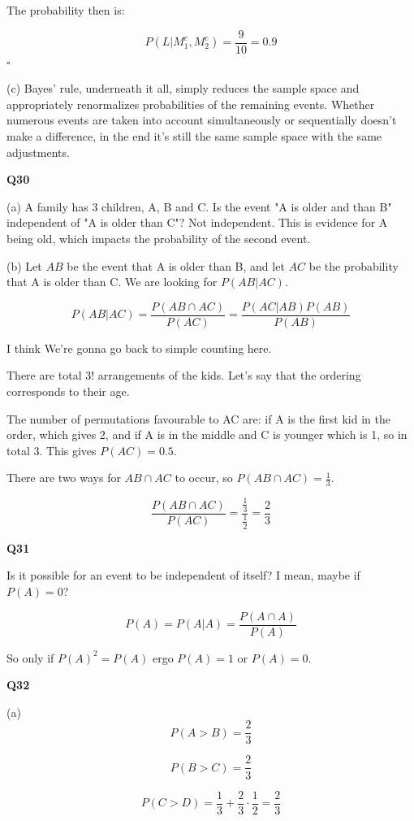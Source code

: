 \documentclass{article}
\newcommand{\qed}{\hfill$\square$}
\begin{document}
				The probability then is:
				
				$$P(L\vert M_1^c, M_2^c) = \frac{9}{10} = 0.9$$\qed
				
			(c) Bayes' rule, underneath it all, simply reduces the sample space and appropriately renormalizes probabilities of the remaining events. Whether numerous events are taken into account simultaneously or sequentially doesn't make a difference, in the end it's still the same sample space with the same adjustments.
			
		\hfill
			
		\textbf{Q30}
		
			(a) A family has 3 children, A, B and C. Is the event "A is older and than B" independent of "A is older than C"?
			Not independent. This is evidence for A being old, which impacts the probability of the second event.
			
			(b) Let $AB$ be the event that A is older than B, and let $AC$ be the probability that A is older than C. We are looking for $P(AB\vert AC)$.
			
			$$P(AB\vert AC) = \frac{P(AB\cap AC)}{P(AC)} = \frac{P(AC\vert AB)P(AB)}{P(AB)} $$
			
			I think We're gonna go back to simple counting here.
			
			There are total 3! arrangements of the kids. Let's say that the ordering corresponds to their age. 
			
			The number of permutations favourable to AC are: if A is the first kid in the order, which gives 2, and if A is in the middle and C is younger which is 1, so in total 3. This gives $P(AC) = 0.5$.
			
			There are two ways for $AB\cap AC$ to occur, so $P(AB\cap AC) = \frac{1}{3}$.
			
			$$\frac{P(AB\cap AC)}{P(AC)} = \frac{\frac{1}{3}}{\frac{1}{2}} = \frac{2}{3}$$
			
		\textbf{Q31}
		
			Is it possible for an event to be independent of itself? I mean, maybe if $P(A) = 0$?
			
			$$P(A) = P(A\vert A) = \frac{P(A\cap A)}{P(A)} $$
			
			So only if $P(A)^2 = P(A)$ ergo $P(A) = 1$ or $P(A) = 0$.
			
		\textbf{Q32}
		
			(a) $$P(A > B) = \frac{2}{3}$$
			
			$$P(B > C) = \frac{2}{3}$$
			
			$$P(C > D) = \frac{1}{3} + \frac{2}{3}\cdot\frac{1}{2} = \frac{2}{3}$$
			
\end{document}
